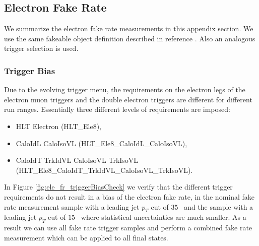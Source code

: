 \subsection{Electron Fake Rate}

We summarize the electron fake rate measurements in this appendix section. We use the same
fakeable object definition described in reference \cite{HWW2011}. Also an analogous trigger
selection is used.

\subsubsection{Trigger Bias}
Due to the evolving trigger menu, the requirements on the electron legs of the electron muon
triggers and the double electron triggers are different for different run ranges. Essentially
three different levels of requirements are imposed:


\begin{itemize}
  \item HLT Electron (HLT\_Ele8),
  \item CaloIdL CaloIsoVL (HLT\_Ele8\_CaloIdL\_CaloIsoVL),
  \item CaloIdT TrkIdVL CaloIsoVL TrkIsoVL (HLT\_Ele8\_CaloIdT\_TrkIdVL\_CaloIsoVL\_TrkIsoVL).
\end{itemize}

In Figure \ref{fig:ele_fr_triggerBiasCheck} we verify that the different trigger requirements do not result in a bias of the
electron fake rate, in the nominal fake rate measurement sample with a leading jet $p_{T}$ cut of $35$ \GeV\ and the
sample with a leading jet $p_{T}$ cut of $15$ \GeV\ where statistical uncertainties are much smaller. As a result 
we can use all fake rate trigger samples and perform a combined fake rate measurement which can be applied to 
all final states.

